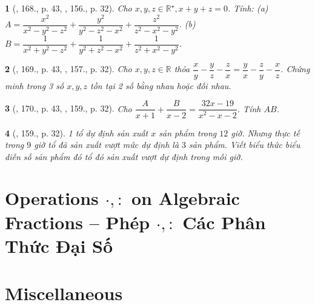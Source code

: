 \documentclass{article}
\newtheorem{baitoan}{}
\begin{document}
\begin{baitoan}[\cite{Tuyen_Toan_8_old}, 168., p. 43, \cite{Tuyen_Toan_8}, 156., p. 32]
	Cho $x,y,z\in\mathbb{R}^\star,x + y + z = 0$. Tính: (a) $A = \dfrac{x^2}{x^2 - y^2 - z^2} + \dfrac{y^2}{y^2 - z^2 - x^2} + \dfrac{z^2}{z^2 - x^2 - y^2}$. (b) $B = \dfrac{1}{x^2 + y^2 - z^2} + \dfrac{1}{y^2 + z^2 - x^2} + \dfrac{1}{z^2 + x^2 - y^2}$.
\end{baitoan}

\begin{baitoan}[\cite{Tuyen_Toan_8_old}, 169., p. 43, \cite{Tuyen_Toan_8}, 157., p. 32]
	Cho $x,y,z\in\mathbb{R}$ thỏa $\dfrac{x}{y} - \dfrac{y}{z} - \dfrac{z}{x} = \dfrac{y}{x} - \dfrac{z}{y} - \dfrac{x}{z}$. Chứng minh trong 3 số $x,y,z$ tồn tại 2 số bằng nhau hoặc đối nhau.
\end{baitoan}

\begin{baitoan}[\cite{Tuyen_Toan_8_old}, 170., p. 43, \cite{Tuyen_Toan_8}, 159., p. 32]
	Cho $\dfrac{A}{x + 1} + \dfrac{B}{x - 2} = \dfrac{32x - 19}{x^2 - x - 2}$. Tính $AB$.
\end{baitoan}

\begin{baitoan}[\cite{Tuyen_Toan_8}, 159., p. 32]
	1 tổ dự định sản xuất $x$ sản phẩm trong $12$ giờ. Nhưng thực tế trong $9$ giờ tổ đã sản xuất vượt mức dự định là $3$ sản phẩm. Viết biểu thức biểu diễn số sản phẩm đó tổ đó sản xuất vượt dự định trong mỗi giờ.
\end{baitoan}


\section{Operations $\cdot,:$ on Algebraic Fractions -- Phép $\cdot,:$ Các Phân Thức Đại Số}


\section{Miscellaneous}


\printbibliography[heading=bibintoc]
	
\end{document}
